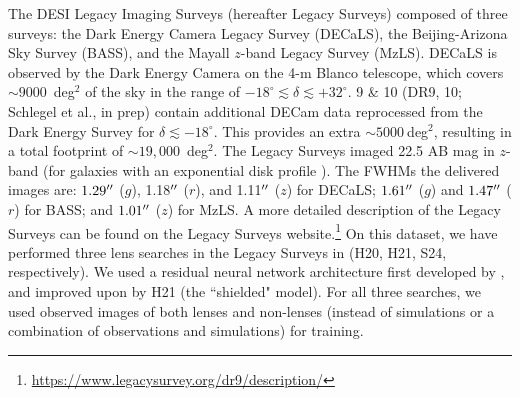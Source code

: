 
The DESI Legacy Imaging Surveys (hereafter Legacy Surveys)  composed of three surveys: 
the Dark Energy Camera Legacy Survey (DECaLS), the Beijing-Arizona Sky Survey (BASS), and the Mayall $z$-band Legacy Survey (MzLS). 
DECaLS is observed by the Dark Energy Camera \citep[DECam;][]{flaugher2015a} on the 4-m Blanco telescope, which covers $\sim 9000$~deg$^2$ of the sky in the range of $-18^{\circ} \lesssim \delta \lesssim +32^{\circ}$. 
 9 \& 10 (DR9, 10; Schlegel et al., in prep)
contain additional DECam data reprocessed from the Dark Energy Survey \citep[DES;][]{abbott2018a} for $\delta\lesssim-18^{\circ}$.
This provides an extra $\sim 5000~$deg$^2$, resulting in a total footprint of $\sim19,000$~deg$^2$. 
The Legacy Surveys  imaged 
 22.5 AB mag in $z$-band (for galaxies with an exponential disk profile ). 
The  FWHMs  the delivered images are: $1.29^{\prime \prime}$ ($g$), 1.18$^{\prime \prime}$ ($r$), and 1.11$^{\prime \prime}$ ($z$) for DECaLS; $1.61^{\prime \prime}$ ($g$) and $1.47^{\prime \prime}$ ($r$) for BASS; and $1.01^{\prime \prime}$ ($z$) for MzLS.  
A more detailed description of the Legacy Surveys can be found on the Legacy Surveys website.\footnote{\href{https://www.legacysurvey.org/dr9/description/}{https://www.legacysurvey.org/dr9/description/}} 
On this dataset, 
we have performed three lens searches in the Legacy Surveys in  (H20, H21, S24, respectively).
We used a residual neural network architecture first developed by \citet{lanusse2018a}, and improved upon by H21 (the ``shielded" model).
For all three searches, we used observed images of both lenses and non-lenses (instead of simulations or a combination of observations and simulations) for training.